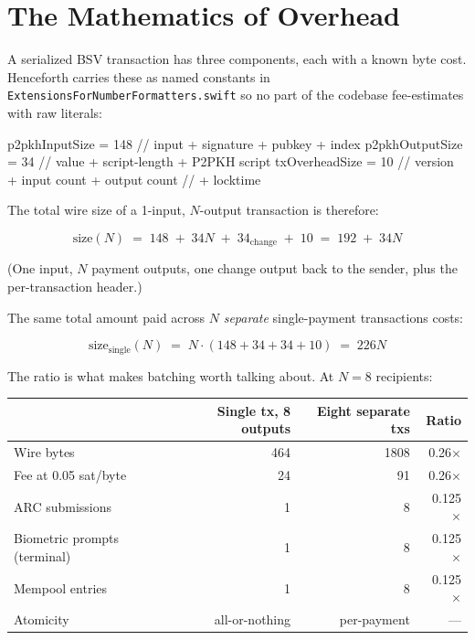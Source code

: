 \documentclass[a4paper, 11pt]{article}
\begin{document}
\section{The Mathematics of Overhead}

A serialized BSV transaction has three components, each with a known byte cost. Henceforth carries these as named constants in \texttt{Extensions\-For\-Number\-Formatters.swift} so no part of the codebase fee-estimates with raw literals:

\begin{forthbox}
  p2pkhInputSize   = 148    // input + signature + pubkey + index
  p2pkhOutputSize  = 34     // value + script-length + P2PKH script
  txOverheadSize   = 10     // version + input count + output count
                            // + locktime
\end{forthbox}

The total wire size of a 1-input, $N$-output transaction is therefore:

\[ \text{size}(N) \;=\; 148 \;+\; 34N \;+\; 34_{\text{change}} \;+\; 10 \;=\; 192 \;+\; 34N \]

(One input, $N$ payment outputs, one change output back to the sender, plus the per-transaction header.)

The same total amount paid across $N$ \emph{separate} single-payment transactions costs:

\[ \text{size}_{\text{single}}(N) \;=\; N \cdot (148 + 34 + 34 + 10) \;=\; 226 N \]

The ratio is what makes batching worth talking about. At $N=8$ recipients:

\begin{center}
\begin{tabular}{@{} l r r r @{}}
\toprule
 & \textbf{Single tx, 8 outputs} & \textbf{Eight separate txs} & \textbf{Ratio} \\
\midrule
Wire bytes               & 464   & 1808  & 0.26\(\times\) \\
Fee at 0.05 sat/byte     & 24    & 91    & 0.26\(\times\) \\
ARC submissions          & 1     & 8     & 0.125\(\times\) \\
Biometric prompts (terminal) & 1 & 8     & 0.125\(\times\) \\
Mempool entries          & 1     & 8     & 0.125\(\times\) \\
Atomicity                & all-or-nothing & per-payment & --- \\
\bottomrule
\end{tabular}
\end{center}
\end{document}
